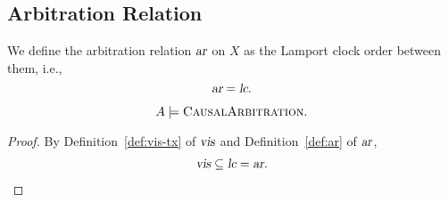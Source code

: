 
\subsection{Arbitration Relation}  \label{ss:ar}

\begin{appdefinition} \label{def:ar}
  We define the arbitration relation $\textsl{ar}$ on $X$
  as the Lamport clock order between them, i.e.,
  \[
    \textsl{ar} = \textsl{lc}.
  \]
\end{appdefinition}

\begin{apptheorem} \label{thm:ca}
  \[
    A \models \textsc{CausalArbitration}.
  \]
\end{apptheorem}

\begin{proof} \label{proof:ca}
  By Definition~\ref{def:vis-tx} of $\textsl{vis}$ and Definition~\ref{def:ar} of $\textsl{ar}$,
  \begin{align*}
    \textsl{vis} \subseteq \textsl{lc} = \textsl{ar}.
  \end{align*}
\end{proof}
